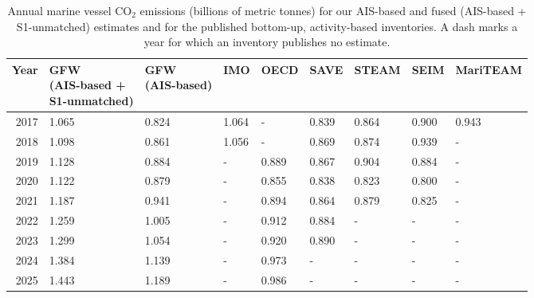 \begin{table}[!h]
\centering
\caption{\label{tab:inventory_comparison_all_sources}Annual marine vessel CO$_{2}$ emissions (billions of metric tonnes) for our AIS-based and fused (AIS-based + S1-unmatched) estimates and for the published bottom-up, activity-based inventories. A dash marks a year for which an inventory publishes no estimate.}
\centering
\fontsize{7}{9}\selectfont
\setlength{\tabcolsep}{3pt}
\begin{tabular}[t]{r|l|l|l|l|l|l|l|l}
\hline
Year & \shortstack{GFW\\(AIS-based +\\S1-unmatched)} & \shortstack{GFW\\(AIS-based)} & IMO & OECD & SAVE & STEAM & SEIM & MariTEAM\\
\hline
2017 & 1.065 & 0.824 & 1.064 & - & 0.839 & 0.864 & 0.900 & 0.943\\
\hline
2018 & 1.098 & 0.861 & 1.056 & - & 0.869 & 0.874 & 0.939 & -\\
\hline
2019 & 1.128 & 0.884 & - & 0.889 & 0.867 & 0.904 & 0.884 & -\\
\hline
2020 & 1.122 & 0.879 & - & 0.855 & 0.838 & 0.823 & 0.800 & -\\
\hline
2021 & 1.187 & 0.941 & - & 0.894 & 0.864 & 0.879 & 0.825 & -\\
\hline
2022 & 1.259 & 1.005 & - & 0.912 & 0.884 & - & - & -\\
\hline
2023 & 1.299 & 1.054 & - & 0.920 & 0.890 & - & - & -\\
\hline
2024 & 1.384 & 1.139 & - & 0.973 & - & - & - & -\\
\hline
2025 & 1.443 & 1.189 & - & 0.986 & - & - & - & -\\
\hline
\end{tabular}
\end{table}
